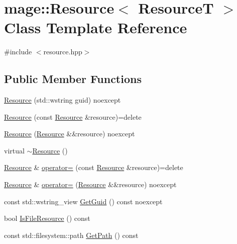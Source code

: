 \hypertarget{classmage_1_1_resource}{}\section{mage\+:\+:Resource$<$ ResourceT $>$ Class Template Reference}
\label{classmage_1_1_resource}


{\ttfamily \#include $<$resource.\+hpp$>$}

\subsection*{Public Member Functions}
\begin{DoxyCompactItemize}
\item 
\mbox{\hyperlink{classmage_1_1_resource_a10fbd756dae89a3ea9ba13a40c631238}{Resource}} (std\+::wstring guid) noexcept
\item 
\mbox{\hyperlink{classmage_1_1_resource_a53da586d9bae285ab50c4cca2421a9ce}{Resource}} (const \mbox{\hyperlink{classmage_1_1_resource}{Resource}} \&resource)=delete
\item 
\mbox{\hyperlink{classmage_1_1_resource_adfff024cb267644156ba1b357d6f8d10}{Resource}} (\mbox{\hyperlink{classmage_1_1_resource}{Resource}} \&\&resource) noexcept
\item 
virtual \mbox{\hyperlink{classmage_1_1_resource_a56a3ac799224e100b271b65ec455b59e}{$\sim$\+Resource}} ()
\item 
\mbox{\hyperlink{classmage_1_1_resource}{Resource}} \& \mbox{\hyperlink{classmage_1_1_resource_a938159cb02ec565b9b957f993db4769d}{operator=}} (const \mbox{\hyperlink{classmage_1_1_resource}{Resource}} \&resource)=delete
\item 
\mbox{\hyperlink{classmage_1_1_resource}{Resource}} \& \mbox{\hyperlink{classmage_1_1_resource_aa1f7a7ddd31f4fc16293b4a5ca9a93c8}{operator=}} (\mbox{\hyperlink{classmage_1_1_resource}{Resource}} \&\&resource) noexcept
\item 
const std\+::wstring\+\_\+view \mbox{\hyperlink{classmage_1_1_resource_ac92abd799e0df35014c849be6f7a04eb}{Get\+Guid}} () const noexcept
\item 
bool \mbox{\hyperlink{classmage_1_1_resource_ae783140e30a974c8820e5ae8be9e4b44}{Is\+File\+Resource}} () const
\item 
const std\+::filesystem\+::path \mbox{\hyperlink{classmage_1_1_resource_a7611d0317a247d324d432b26aab6aee2}{Get\+Path}} () const
\end{DoxyCompactItemize}
